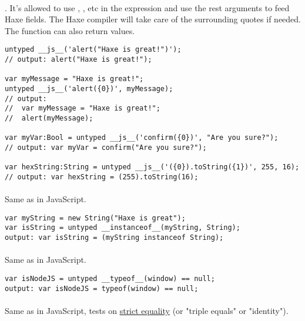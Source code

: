 \paragraph{}
. It's allowed to use , ,  etc in the expression and use the rest arguments to feed Haxe fields. The Haxe compiler will take care of the surrounding quotes if needed. The function can also return values.

\begin{lstlisting}
untyped __js__('alert("Haxe is great!")');
// output: alert("Haxe is great!");

var myMessage = "Haxe is great!";
untyped __js__('alert({0})', myMessage);
// output: 
//	var myMessage = "Haxe is great!";
//	alert(myMessage);

var myVar:Bool = untyped __js__('confirm({0})', "Are you sure?");
// output: var myVar = confirm("Are you sure?");

var hexString:String = untyped __js__('({0}).toString({1})', 255, 16);
// output: var hexString = (255).toString(16);
\end{lstlisting}

\paragraph{} 
Same as  in JavaScript.

\begin{lstlisting}
var myString = new String("Haxe is great");
var isString = untyped __instanceof__(myString, String);
output: var isString = (myString instanceof String);
\end{lstlisting}

\paragraph{} 
Same as  in JavaScript.

\begin{lstlisting}
var isNodeJS = untyped __typeof__(window) == null;
output: var isNodeJS = typeof(window) == null;
\end{lstlisting}

\paragraph{} 
Same as   in JavaScript, tests on \href{https://developer.mozilla.org/en-US/docs/Web/JavaScript/Equality_comparisons_and_sameness}{strict equality} (or "triple equals" or "identity").

